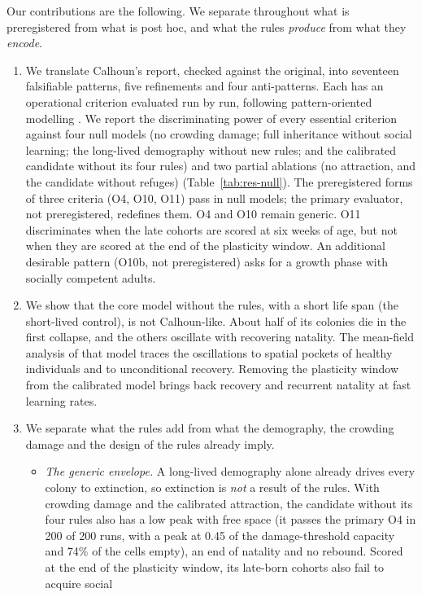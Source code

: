 Our contributions are the following. We separate throughout what is preregistered from what is post hoc, and what
the rules \emph{produce} from what they \emph{encode}.
\begin{enumerate}
\item We translate Calhoun's report, checked against the original, into seventeen falsifiable patterns, five
  refinements and four anti-patterns. Each has an operational criterion evaluated run by run, following
  pattern-oriented modelling \cite{Grimm2005}. We report the discriminating power of every essential criterion
  against four null models (no crowding damage; full inheritance without social learning; the long-lived demography
  without new rules; and the calibrated candidate without its four rules) and two partial ablations (no attraction,
  and the candidate without refuges) (Table~\ref{tab:res-null}). The preregistered forms of three criteria (O4, O10, O11) pass in null models; the primary evaluator,
  not preregistered, redefines them. O4 and O10 remain generic. O11 discriminates when the late cohorts are scored at six weeks
  of age, but not when they are scored at the end of the plasticity window. An additional
  desirable pattern (O10b, not preregistered) asks for a growth phase with socially competent adults.
\item We show that the core model without the rules, with a short life span (the short-lived control), is not
  Calhoun-like.
  About half of its colonies die in the first collapse, and the others oscillate with recovering natality.
  The mean-field analysis of that model traces the oscillations to spatial pockets of healthy individuals and to
  unconditional recovery.
  Removing the plasticity window from the calibrated model brings back recovery and recurrent natality at fast
  learning rates.
\item We separate what the rules add from what the demography, the crowding damage and the design of the rules
  already imply.
  \begin{itemize}
  \item \emph{The generic envelope.} A long-lived demography alone already drives every colony to extinction, so
    extinction is \emph{not} a result of the rules. With crowding damage and the calibrated attraction, the
    candidate without its four rules also has a low peak with free space (it passes the primary O4 in 200 of 200
    runs, with a peak at 0.45 of the damage-threshold capacity and 74\% of the cells empty), an end of natality and
    no rebound. Scored at the end of the plasticity window, its late-born cohorts also fail to acquire social

\end{itemize}
\end{enumerate}
